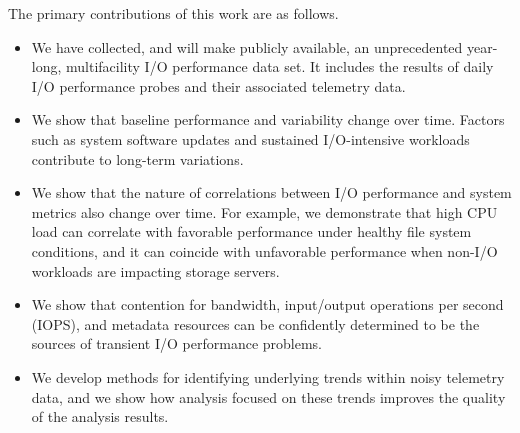 

The primary contributions of this work are as follows. 
\begin{itemize}[leftmargin=*]
\item We have collected, and will make publicly available, an unprecedented year-long, multifacility
I/O performance data set. It includes the results of daily I/O performance
probes and their associated telemetry data.
\item We show that baseline performance and variability change over time.
Factors such as system software updates and sustained I/O-intensive workloads contribute to long-term variations.
\item We show that the nature of correlations between I/O performance and system metrics also change over
time. For example, we demonstrate that high CPU load can correlate with favorable performance under healthy file system conditions, and it can coincide with unfavorable performance when non-I/O workloads are impacting storage servers.
\item We show that contention for bandwidth, input/output operations per second (IOPS), and metadata resources can be confidently determined to be the sources of transient I/O performance problems.
\item We develop methods for identifying
underlying trends within noisy telemetry data, and we show how analysis focused
on these trends improves the quality of the analysis results.
\end{itemize}


